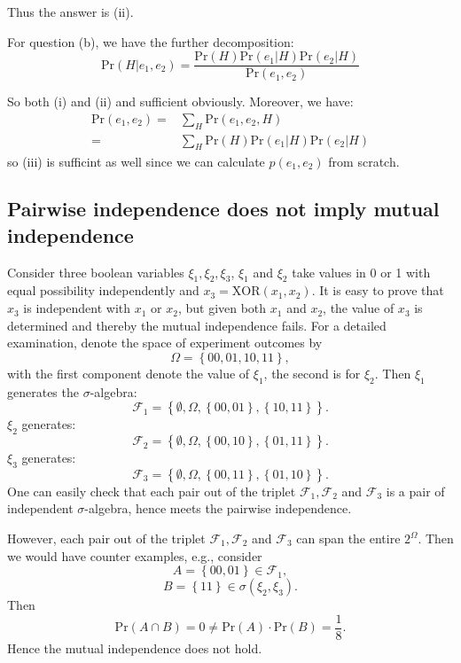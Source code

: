 \documentclass[UTF8]{ctexart}
\begin{document}
Thus the answer is (ii).

For question (b), we have the further decomposition:
$$\text{Pr}(H|e_{1},e_{2})=\frac{\text{Pr}(H)\text{Pr}(e_{1}|H)\text{Pr}(e_{2}|H)}{\text{Pr}(e_{1},e_{2})}$$

So both (i) and (ii) and sufficient obviously. 
Moreover, we have:
\begin{align}
\text{Pr}(e_{1},e_{2})=& \sum_{H}\text{Pr}(e_{1},e_{2},H) \nonumber \\
=&\sum_{H} \text{Pr}(H)\text{Pr}(e_{1}|H)\text{Pr}(e_{2}|H) \nonumber 
\end{align}
so (iii) is sufficint as well since we can calculate $p(e_{1},e_{2})$ from scratch.

\subsection{Pairwise independence does not imply mutual independence}
Consider three boolean variables $\xi_{1},\xi_{2},\xi_{3}$, $\xi_{1}$ and $\xi_{2}$ take values in 0 or 1 with equal possibility independently and $x_{3}=\text{XOR}(x_{1},x_{2})$.
It is easy to prove that $x_{3}$ is independent with $x_{1}$ or $x_{2}$, but given both $x_{1}$ and $x_{2}$, the value of $x_{3}$ is determined and thereby the mutual independence fails.
For a detailed examination, denote the space of experiment outcomes by 
$$\Omega=\left\{00,01,10,11 \right\},$$
with the first component denote the value of $\xi_{1}$, the second is for $\xi_{2}$. 
Then $\xi_{1}$ generates the $\sigma$-algebra:
$$\mathcal{F}_{1}=\left\{\emptyset,\Omega,\left\{00,01\right\},\left\{10,11\right\} \right\}.$$
$\xi_{2}$ generates:
$$\mathcal{F}_{2}=\left\{\emptyset,\Omega,\left\{00,10\right\},\left\{01,11\right\} \right\}.$$
$\xi_{3}$ generates:
$$\mathcal{F}_{3}=\left\{\emptyset,\Omega,\left\{00,11\right\},\left\{01,10\right\} \right\}.$$
One can easily check that each pair out of the triplet $\mathcal{F}_{1},\mathcal{F}_{2}$ and $\mathcal{F}_{3}$ is a pair of independent $\sigma$-algebra, hence meets the pairwise independence. 

However, each pair out of the triplet $\mathcal{F}_{1},\mathcal{F}_{2}$ and $\mathcal{F}_{3}$ can span the entire $2^{\Omega}$. 
Then we would have counter examples, e.g., consider 
$$A=\left\{00,01\right\}\in\mathcal{F}_{1},$$
$$B=\left\{11\right\}\in\sigma(\xi_{2},\xi_{3}).$$
Then 
$$\text{Pr}(A\cap B)=0\neq \text{Pr}(A)\cdot\text{Pr}(B)=\frac{1}{8}.$$
Hence the mutual independence does not hold. 
\end{document}
